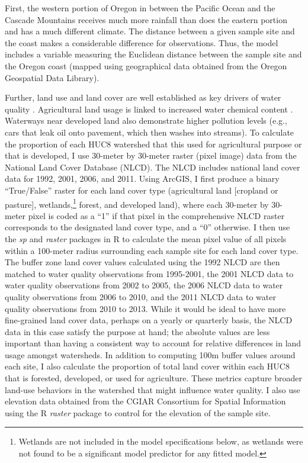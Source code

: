 \documentclass[12pt,a4paper,titlepage]{article}
\begin{document}
First, the western portion of Oregon in between the Pacific Ocean and the Cascade Mountains receives much more rainfall than does the eastern portion and has a much different climate. The distance between a given sample site and the coast makes a considerable difference for observations. Thus, the model includes a variable measuring the Euclidean distance between the sample site and the Oregon coast (mapped using geographical data obtained from the Oregon Geospatial Data Library).

Further, land use and land cover are well established as key drivers of water quality \parencite{tong2002,meador2003}. Agricultural land usage is linked to increased water chemical content \parencite{skaggs1994,johnes1997}. Waterways near developed land also demonstrate higher pollution levels \parencite{wang2001} (e.g., cars that leak oil onto pavement, which then washes into streams). To calculate the proportion of each HUC8 watershed that this used for agricultural purpose or that is developed, I use 30-meter by 30-meter raster (pixel image) data from the National Land Cover Database (NLCD). The NLCD includes national land cover data for 1992, 2001, 2006, and 2011. Using ArcGIS, I first produce a binary “True/False” raster for each land cover type (agricultural land [cropland or pasture], wetlands,\footnote{Wetlands are not included in the model specifications below, as wetlands were not found to be a significant model predictor for any fitted model.} forest, and developed land), where each 30-meter by 30-meter pixel is coded as a “1” if that pixel in the comprehensive NLCD raster corresponds to the designated land cover type, and a “0” otherwise. I then use the \textit{sp} \parencite{pebesma2014} and \textit{raster} \parencite{hijmans2014} packages in R to calculate the mean pixel value of all pixels within a 100-meter radius surrounding each sample site for each land cover type. The buffer zone land cover values calculated using the 1992 NLCD are then matched to water quality observations from 1995-2001, the 2001 NLCD data to water quality observations from 2002 to 2005, the 2006 NLCD data to water quality observations from 2006 to 2010, and the 2011 NLCD data to water quality observations from 2010 to 2013. While it would be ideal to have more fine-grained land cover data, perhaps on a yearly or quarterly basis, the NLCD data in this case satisfy the purpose at hand; the absolute values are less important than having a consistent way to account for relative differences in land usage amongst watersheds. In addition to computing 100m buffer values around each site, I also calculate the proportion of total land cover within each HUC8 that is forested, developed, or used for agriculture. These metrics capture broader land-use behaviors in the watershed that might influence water quality. I also use elevation data obtained from the CGIAR Consortium for Spatial Information using the R \textit{raster} package \parencite{hijmans2014} to control for the elevation of the sample site.
\end{document}
